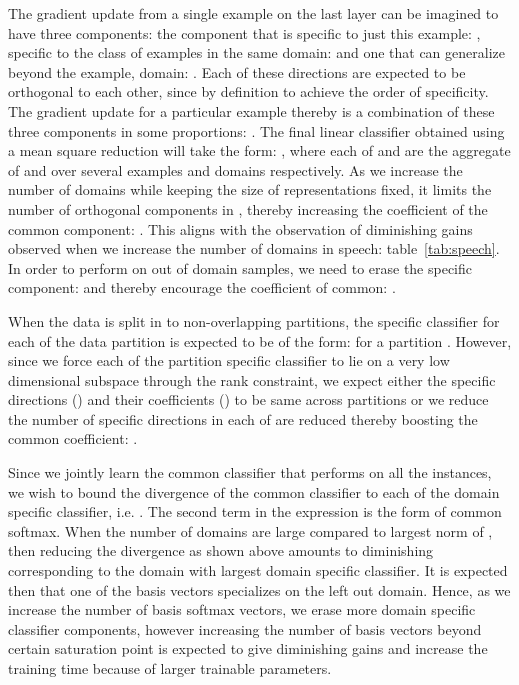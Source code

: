 \documentclass{article}
\begin{document}
The gradient update from a single example on the last layer can be imagined to have three components: the component that is specific to just this example: , specific to the class of examples in the same domain:  and one that can generalize beyond the example, domain: . Each of these directions are expected to be orthogonal to each other, since by definition to achieve the order of specificity. The gradient update for a particular example thereby is a combination of these three components in some proportions: . The final linear classifier obtained using a mean square reduction will take the form: , where each of  and  are the aggregate of  and  over several examples and domains respectively. As we increase the number of domains while keeping the size of representations fixed, it limits the number of orthogonal components in , thereby increasing the coefficient of the common component: . This aligns with the observation of diminishing gains observed when we increase the number of domains in speech: table~\ref{tab:speech}. In order to perform on out of domain samples, we need to erase the specific component:  and thereby encourage the coefficient of common: .

When the data is split in to non-overlapping partitions, the specific classifier for each of the data partition is expected to be of the form:  for a partition . However, since we force each of the partition specific classifier to lie on a very low dimensional subspace through the rank constraint, we expect either the specific directions () and their coefficients () to be same across partitions or we reduce the number of specific directions in each of  are reduced thereby boosting the common coefficient: .

Since we jointly learn the common classifier that performs on all the instances, we wish to bound the divergence of the common classifier to each of the domain specific classifier, i.e. . The second term in the expression is the form of common softmax. When the number of domains are large compared to largest norm of , then reducing the divergence as shown above amounts to diminishing  corresponding to the domain with largest domain specific classifier. It is expected then that one of the basis vectors specializes on the left out domain. Hence, as we increase the number of basis softmax vectors, we erase more domain specific classifier components, however increasing the number of basis vectors beyond certain saturation point is expected to give diminishing gains and increase the training time because of larger trainable parameters.
\fi
\end{document}
